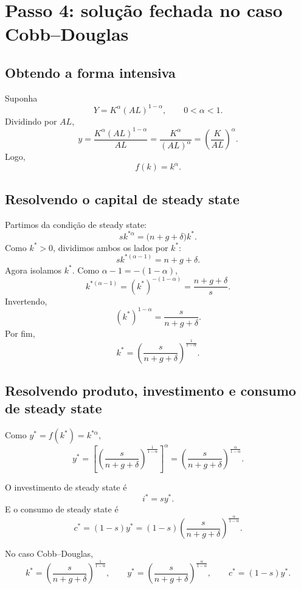 \documentclass[11pt,a4paper]{article}
\begin{document}
\section{Passo 4: solu\c{c}\~ao fechada no caso Cobb--Douglas}

\subsection{Obtendo a forma intensiva}

Suponha
\[
Y=K^\alpha (AL)^{1-\alpha},
\qquad 0<\alpha<1.
\]
Dividindo por \(AL\),
\[
y
=
\frac{K^\alpha (AL)^{1-\alpha}}{AL}
=
\frac{K^\alpha}{(AL)^\alpha}
=
\left(\frac{K}{AL}\right)^\alpha.
\]
Logo,
\[
f(k)=k^\alpha.
\]

\subsection{Resolvendo o capital de steady state}

Partimos da condi\c{c}\~ao de steady state:
\[
sk^{\ast\alpha}=\bigl(n+g+\delta\bigr)k^\ast.
\]
Como \(k^\ast>0\), dividimos ambos os lados por \(k^\ast\):
\[
sk^{\ast(\alpha-1)}=n+g+\delta.
\]
Agora isolamos \(k^\ast\). Como \(\alpha-1=-(1-\alpha)\),
\[
k^{\ast(\alpha-1)}=(k^\ast)^{-(1-\alpha)}
=
\frac{n+g+\delta}{s}.
\]
Invertendo,
\[
(k^\ast)^{1-\alpha}=\frac{s}{n+g+\delta}.
\]
Por fim,
\[
k^\ast=
\left(\frac{s}{n+g+\delta}\right)^{\frac{1}{1-\alpha}}.
\]

\subsection{Resolvendo produto, investimento e consumo de steady state}

Como \(y^\ast=f(k^\ast)=k^{\ast\alpha}\),
\[
y^\ast
=
\left[
\left(\frac{s}{n+g+\delta}\right)^{\frac{1}{1-\alpha}}
\right]^\alpha
=
\left(\frac{s}{n+g+\delta}\right)^{\frac{\alpha}{1-\alpha}}.
\]

O investimento de steady state \'e
\[
i^\ast=sy^\ast.
\]
E o consumo de steady state \'e
\[
c^\ast=(1-s)y^\ast
=(1-s)\left(\frac{s}{n+g+\delta}\right)^{\frac{\alpha}{1-\alpha}}.
\]

\begin{resultado}
No caso Cobb--Douglas,
\[
k^\ast=\left(\frac{s}{n+g+\delta}\right)^{\frac{1}{1-\alpha}},
\qquad
y^\ast=\left(\frac{s}{n+g+\delta}\right)^{\frac{\alpha}{1-\alpha}},
\qquad
c^\ast=(1-s)y^\ast.
\]
\end{resultado}
\end{document}
